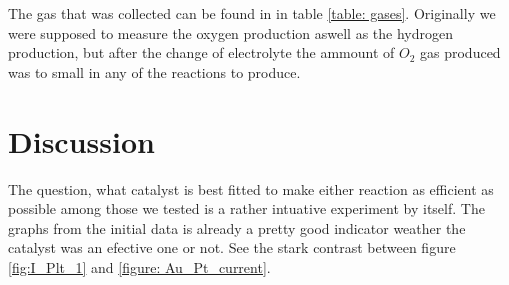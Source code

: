 \documentclass[twocolumn]{revtex4-2}
\begin{document}
\par
The gas that was collected can be found in in table \ref{table: gases}. Originally we were supposed to 
measure the oxygen production aswell as the hydrogen production, but after  the change of electrolyte
the ammount of $O_2$ gas produced was to small in any of the reactions to produce.
\section{Discussion}
The question, what catalyst is best fitted to make either reaction as efficient as 
possible among those we tested is a rather intuative experiment by itself. The 
graphs from the initial data is already a pretty good indicator weather the catalyst
was an efective one or not. See the stark contrast between figure \ref{fig:I_Plt_1} and 
\ref{figure: Au_Pt_current}. 


\end{document}
